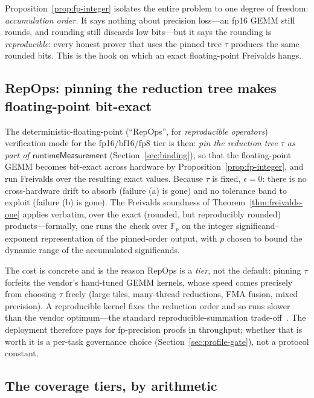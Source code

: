 Proposition~\ref{prop:fp-integer} isolates the entire problem to one degree of freedom:
\emph{accumulation order}. It says nothing about precision loss---an fp16 GEMM still
rounds, and rounding still discards low bits---but it says the rounding is
\emph{reproducible}: every honest prover that uses the pinned tree $\tau$ produces the
same rounded bits. This is the hook on which an exact floating-point Freivalds hangs.

\subsection{RepOps: pinning the reduction tree makes floating-point bit-exact}
\label{sec:repops}

The deterministic-floating-point (``RepOps'', for \emph{reproducible operators})
verification mode for the fp16/bf16/fp8 tier is then: \emph{pin the reduction tree
$\tau$ as part of $\mathsf{runtimeMeasurement}$} (Section~\ref{sec:binding}), so that
the floating-point GEMM becomes bit-exact across hardware by
Proposition~\ref{prop:fp-integer}, and run Freivalds over the resulting exact values.
Because $\tau$ is fixed, $\epsilon = 0$: there is no cross-hardware drift to absorb
(failure (a) is gone) and no tolerance band to exploit (failure (b) is gone). The
Freivalds soundness of Theorem~\ref{thm:freivalds-one} applies verbatim, over the
exact (rounded, but reproducibly rounded) products---formally, one runs the check over
$\mathbb{F}_p$ on the integer significand--exponent representation of the pinned-order
output, with $p$ chosen to bound the dynamic range of the accumulated significands.

The cost is concrete and is the reason RepOps is a \emph{tier}, not the default: pinning
$\tau$ forfeits the vendor's hand-tuned GEMM kernels, whose speed comes precisely from
choosing $\tau$ freely (large tiles, many-thread reductions, FMA fusion, mixed
precision). A reproducible kernel fixes the reduction order and so runs slower than the
vendor optimum---the standard reproducible-summation trade-off~\cite{repbla}. The deployment therefore
pays for fp-precision proofs in throughput; whether that is worth it is a per-task
governance choice (Section~\ref{sec:profile-gate}), not a protocol constant.

\subsection{The coverage tiers, by arithmetic}
\label{sec:coverage-tiers}

